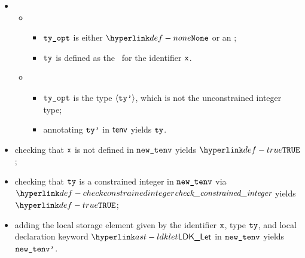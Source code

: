 \ProseParagraph
\AllApply
\begin{itemize}
  \item \OneApplies
  \begin{itemize}
    \item {}
    \begin{itemize}
      \item $\texttt{ty\_opt}$ is either $\None$ or an \unconstrainedintegertype{};
      \item $\texttt{ty}$ is defined as the \parameterizedintegertype\ for the identifier $\texttt{x}$.
    \end{itemize}

    \item {}
    \begin{itemize}
      \item $\texttt{ty\_opt}$ is the type $\langle\texttt{ty'}\rangle$, which is not the unconstrained integer type;
      \item annotating $\texttt{ty'}$ in $\textsf{tenv}$ yields $\texttt{ty}$\ProseOrTypeError.
    \end{itemize}
  \end{itemize}
  \item checking that $\texttt{x}$ is not defined in $\texttt{new\_tenv}$ yields $\True$\ProseOrTypeError;
  \item checking that $\texttt{ty}$ is a constrained integer in $\texttt{new\_tenv}$ via $\checkconstrainedinteger$
        yields $\True$\ProseOrTypeError;
  \item adding the local storage element given by the identifier $\texttt{x}$, type $\texttt{ty}$, and local declaration keyword
        $\LDKLet$ in $\texttt{new\_tenv}$ yields $\texttt{new\_tenv'}$.
\end{itemize}

